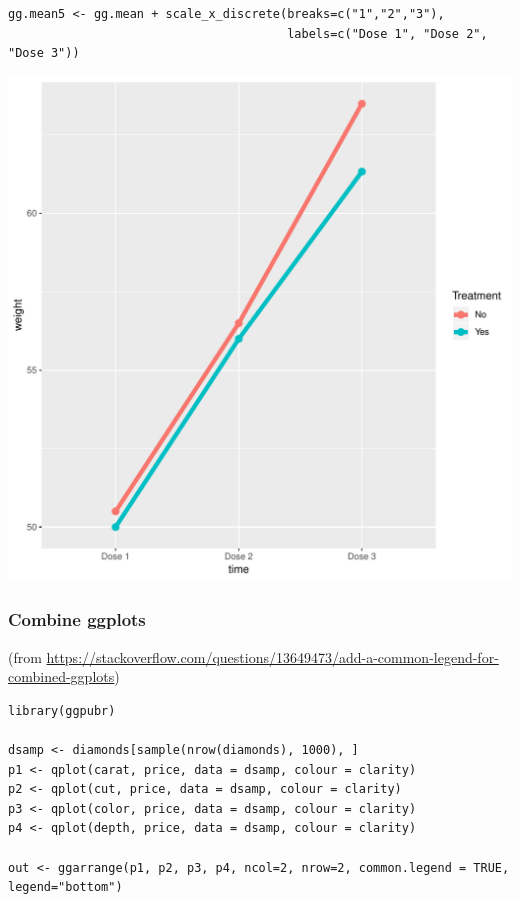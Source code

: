 \documentclass{article}
\begin{document}
\lstset{language=r,label= ,caption= ,captionpos=b,numbers=none}
\begin{lstlisting}
gg.mean5 <- gg.mean + scale_x_discrete(breaks=c("1","2","3"),
                                       labels=c("Dose 1", "Dose 2", "Dose 3"))
\end{lstlisting}

\begin{center}
\includegraphics[width=.9\linewidth]{./figures/fig-meanTime5.pdf}
\end{center}

\clearpage

\subsubsection{Combine ggplots}
\label{sec:org90c681d}
(from \url{https://stackoverflow.com/questions/13649473/add-a-common-legend-for-combined-ggplots})

\lstset{language=r,label= ,caption= ,captionpos=b,numbers=none}
\begin{lstlisting}
library(ggpubr)

dsamp <- diamonds[sample(nrow(diamonds), 1000), ]
p1 <- qplot(carat, price, data = dsamp, colour = clarity)
p2 <- qplot(cut, price, data = dsamp, colour = clarity)
p3 <- qplot(color, price, data = dsamp, colour = clarity)
p4 <- qplot(depth, price, data = dsamp, colour = clarity) 

out <- ggarrange(p1, p2, p3, p4, ncol=2, nrow=2, common.legend = TRUE, legend="bottom")
\end{lstlisting}
\end{document}
